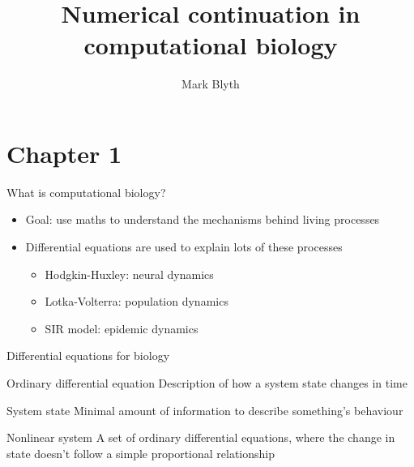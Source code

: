 \documentclass[presentation]{beamer}
\author{Mark Blyth}
\date{}
\title{Numerical continuation in computational biology}
\begin{document}
\maketitle

\section{Chapter 1}
\label{sec:org22329bb}
\begin{frame}[label={sec:org7930d66}]{What is computational biology?}
\begin{itemize}
\item Goal: use maths to understand the mechanisms behind living processes
\item Differential equations are used to explain lots of these processes
\begin{itemize}
\item Hodgkin-Huxley: neural dynamics
\item Lotka-Volterra: population dynamics
\item SIR model: epidemic dynamics
\end{itemize}
\end{itemize}
\end{frame}

\begin{frame}[label={sec:org788c7c6}]{Differential equations for biology}
\begin{block}{Ordinary differential equation}
Description of how a system state changes in time
\end{block}

\begin{block}{System state}
Minimal amount of information to describe something's behaviour
\end{block}

\begin{block}{Nonlinear system}
A set of ordinary differential equations, where the change in state doesn't follow a simple proportional relationship
\end{block}
\end{frame}
\end{document}
